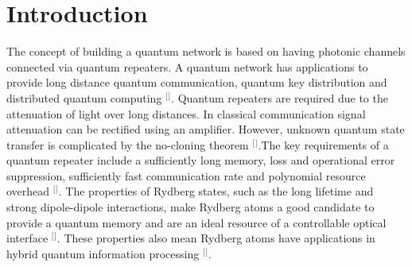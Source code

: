 \section{\label{sec:level1}Introduction}
The concept of building a quantum network is based on having photonic channels connected via quantum repeaters. A quantum network has applications to provide long distance quantum communication, quantum key distribution and distributed quantum computing $^{[}$\citep{Sasaki2017QuantumHeading,Zwerger2018Long-RangeTransmission}$^{]}$. Quantum repeaters are required due to the attenuation of light over long distances. In classical communication signal attenuation can be rectified using an amplifier. However, unknown quantum state transfer is complicated by the no-cloning theorem $^{[}$\citep{Sangouard2011QuantumOptics,Wootters1982ACloned}$^{]}$.The key requirements of a quantum repeater include a sufficiently long memory, loss and operational error suppression, sufficiently fast communication rate and polynomial resource overhead $^{[}$\citep{Briegel1998QuantumCommunication,Duan2001Long-distanceOptics,Muralidharan2016OptimalCommunication}$^{]}$. The properties of Rydberg states, such as the long lifetime and strong dipole-dipole interactions, make Rydberg atoms a good candidate to provide a quantum memory and are an ideal resource of a controllable optical interface $^{[}$\citep{Saffman2010QuantumAtoms}$^{]}$. These properties also mean Rydberg atoms have applications in hybrid quantum information processing $^{[}$\citep{Petrosyan2009ReversibleEnsembles,Pritchard2014HybridResonator}$^{]}$.

